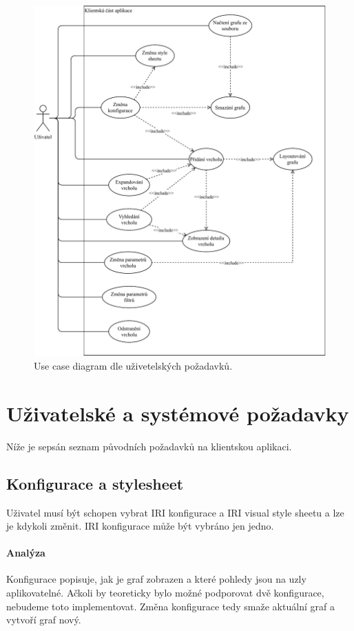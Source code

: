 \begin{figure}
    \centering
    \includegraphics[width=\textwidth]{media/use-case.pdf}
    \caption{Use case diagram dle uživetelských požadavků.}
    \label{fig:use-case}
\end{figure}

\section{Uživatelské a systémové požadavky}

Níže je sepsán seznam původních požadavků na klientskou aplikaci.

\subsection*{Konfigurace a stylesheet}
Uživatel musí být schopen vybrat IRI konfigurace a IRI visual style sheetu a lze je kdykoli změnit. IRI konfigurace může být vybráno jen jedno.

\paragraph{Analýza} Konfigurace popisuje, jak je graf zobrazen a které pohledy jsou na uzly aplikovatelné. Ačkoli by teoreticky bylo možné podporovat dvě konfigurace, nebudeme toto implementovat. Změna konfigurace tedy smaže aktuální graf a vytvoří graf nový.

